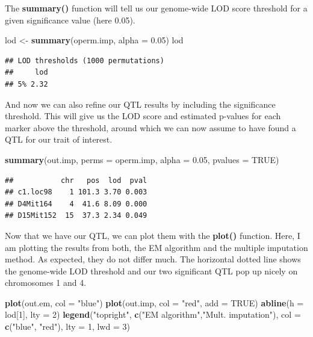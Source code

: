 \documentclass[12pt,]{book}
\newenvironment{Shaded}{\begin{snugshade}}{\end{snugshade}}
\newcommand{\KeywordTok}[1]{\textcolor[rgb]{0.13,0.29,0.53}{\textbf{{#1}}}}
\newcommand{\DataTypeTok}[1]{\textcolor[rgb]{0.13,0.29,0.53}{{#1}}}
\newcommand{\DecValTok}[1]{\textcolor[rgb]{0.00,0.00,0.81}{{#1}}}
\newcommand{\FloatTok}[1]{\textcolor[rgb]{0.00,0.00,0.81}{{#1}}}
\newcommand{\StringTok}[1]{\textcolor[rgb]{0.31,0.60,0.02}{{#1}}}
\newcommand{\OtherTok}[1]{\textcolor[rgb]{0.56,0.35,0.01}{{#1}}}
\newcommand{\NormalTok}[1]{{#1}}
\theoremstyle{definition}
\theoremstyle{definition}
\theoremstyle{remark}
\begin{document}
The \textbf{summary()} function will tell us our genome-wide LOD score
threshold for a given significance value (here 0.05).

\begin{Shaded}
\begin{Highlighting}[]
\NormalTok{lod <-}\StringTok{ }\KeywordTok{summary}\NormalTok{(operm.imp, }\DataTypeTok{alpha =} \FloatTok{0.05}\NormalTok{)}
\NormalTok{lod}
\end{Highlighting}
\end{Shaded}

\begin{verbatim}
## LOD thresholds (1000 permutations)
##     lod
## 5% 2.32
\end{verbatim}

And now we can also refine our QTL results by including the significance
threshold. This will give us the LOD score and estimated p-values for
each marker above the threshold, around which we can now assume to have
found a QTL for our trait of interest.

\begin{Shaded}
\begin{Highlighting}[]
\KeywordTok{summary}\NormalTok{(out.imp, }\DataTypeTok{perms =} \NormalTok{operm.imp, }\DataTypeTok{alpha =} \FloatTok{0.05}\NormalTok{, }\DataTypeTok{pvalues =} \OtherTok{TRUE}\NormalTok{)}
\end{Highlighting}
\end{Shaded}

\begin{verbatim}
##           chr   pos  lod  pval
## c1.loc98    1 101.3 3.70 0.003
## D4Mit164    4  41.6 8.09 0.000
## D15Mit152  15  37.3 2.34 0.049
\end{verbatim}

Now that we have our QTL, we can plot them with the \textbf{plot()}
function. Here, I am plotting the results from both, the EM algorithm
and the multiple imputation method. As expected, they do not differ
much. The horizontal dotted line shows the genome-wide LOD threshold and
our two significant QTL pop up nicely on chromosomes 1 and 4.

\begin{Shaded}
\begin{Highlighting}[]
\KeywordTok{plot}\NormalTok{(out.em, }\DataTypeTok{col =} \StringTok{"blue"}\NormalTok{)}
\KeywordTok{plot}\NormalTok{(out.imp, }\DataTypeTok{col =} \StringTok{"red"}\NormalTok{, }\DataTypeTok{add =} \OtherTok{TRUE}\NormalTok{)}
\KeywordTok{abline}\NormalTok{(}\DataTypeTok{h =} \NormalTok{lod[}\DecValTok{1}\NormalTok{], }\DataTypeTok{lty =} \DecValTok{2}\NormalTok{)}
\KeywordTok{legend}\NormalTok{(}\StringTok{"topright"}\NormalTok{, }\KeywordTok{c}\NormalTok{(}\StringTok{"EM algorithm"}\NormalTok{,}\StringTok{"Mult. imputation"}\NormalTok{), }
	\DataTypeTok{col =} \KeywordTok{c}\NormalTok{(}\StringTok{"blue"}\NormalTok{, }\StringTok{"red"}\NormalTok{), }\DataTypeTok{lty =} \DecValTok{1}\NormalTok{, }\DataTypeTok{lwd =} \DecValTok{3}\NormalTok{)}
\end{Highlighting}
\end{Shaded}
\end{document}
